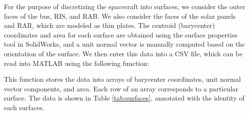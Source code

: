 For the purpose of discretizing the spacecraft into surfaces, we consider the outer faces of the bus, RIS, and RAB. We also consider the faces of the solar panels and RAR, which are modeled as thin plates. The centroid (barycenter) coordinates and area for each surface are obtained using the surface properties tool in SolidWorks, and a unit normal vector is manually computed based on the orientation of the surface. We then enter this data into a CSV file, which can be read into MATLAB using the following function:



This function stores the data into arrays of barycenter coordinates, unit normal vector components, and area. Each row of an array corresponds to a particular surface. The data is shown in Table \ref{tab:surfaces}, annotated with the identity of each surfaces.

